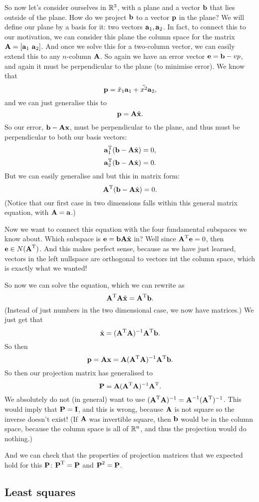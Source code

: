 So now let's consider ourselves in $\RR^3$, with a plane and a vector $\vb$ that lies outside of the plane. How do we project $\vb$ to a vector $\vp$ in the plane? We will define our plane by a basis for it: two vectors $\va_1, \va_2$. In fact, to connect this to our motivation, we can consider this plane the column space for the matrix $\mA = [\va_1\ \va_2]$. And once we solve this for a two-column vector, we can easily extend this to any $n$-column $\mA$. So again we have an error vector $\ve=\vb-vp$, and again it must be perpendicular to the plane (to minimise error). We know that 
\[ \vp = \hat{x}_1\va_1 + \hat{x^2}\va_2, \]
and we can just generalise this to
\[ \vp = \mA \hat{\vx}. \]
So our error, $\vb - \mA\vx$, must be perpendicular to the plane, and thus must be perpendicular to both our basis vectors:
\[ \T{\va_1}(\vb - \mA\hat{\vx}) = 0, \]
\[ \T{\va_2}(\vb - \mA\hat{\vx}) = 0. \]
But we can easily generalise and but this in matrix form:
\[ \T\mA(\vb - \mA\hat{\vx}) = 0. \]
(Notice that our first case in two dimensions falls within this general matrix equation, with $\mA = \va$.)

Now we want to connect this equation with the four fundamental subspaces we know about. Which subspace is $\ve = \vb \mA \hat{\vx}$ in? Well since $\T\mA \ve = 0$, then $\ve \in N(\T\mA)$. And this makes perfect sense, because as we have just learned, vectors in the left nullspace are orthogonal to vectors int the column space, which is exactly what we wanted! 

So now we can solve the equation, which we can rewrite as
\[ \T\mA\mA\hat{\vx} = \T\mA\vb. \]
(Instead of just numbers in the two dimensional case, we now have matrices.) 
We just get that
\[ \hat{\vx} = (\T\mA\mA)^{-1}\T\mA\vb. \]
So then
\[ \vp = \mA\vx = \mA (\T\mA\mA)^{-1}\T\mA\vb. \]
So then our projection matrix has generalised to
\[ \mP = \mA (\T\mA\mA)^{-1}\T\mA. \]
\bdb
We absolutely do not (in general) want to use $(\T\mA\mA)^{-1} = \mA^{-1}(\T\mA)^{-1}$. This would imply that $\mP = \mI$, and this is wrong, because $\mA$ is not square so the inverse doesn't exist! (If $\mA$ was invertible square, then $\vb$ would be in the column space, because the column space is all of $\RR^n$, and thus the projection would do nothing.)
\edb

And we can check that the properties of projection matrices that we expected hold for this $\mP$: $\T\mP = \mP$ and $\mP^2 = \mP$.

\subsection{Least squares}

